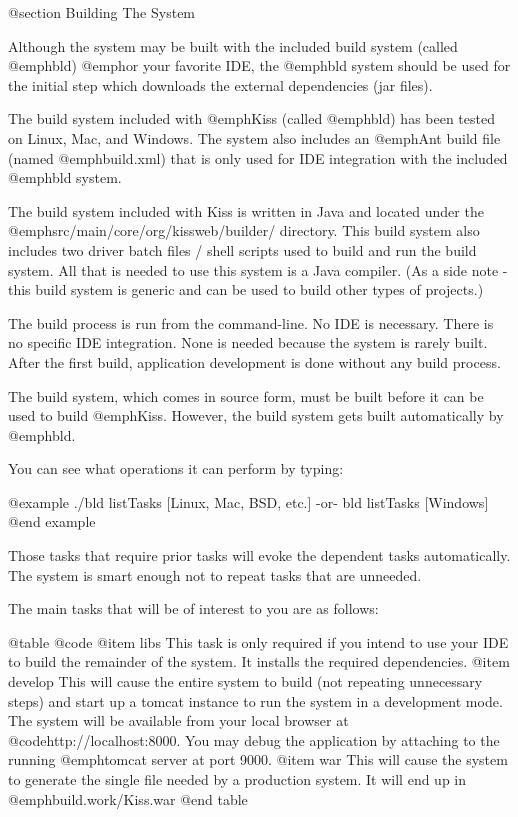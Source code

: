 @section Building The System

Although the system may be built with the included build system
(called @emph{bld}) @emph{or} your favorite IDE, the @emph{bld}
system should be used for the initial step which downloads the external
dependencies (jar files).

The build system included with @emph{Kiss} (called @emph{bld}) has
been tested on Linux, Mac, and Windows.  The system also includes an
@emph{Ant} build file (named @emph{build.xml}) that is only used for
IDE integration with the included @emph{bld} system.

The build system included with Kiss is written in Java and located
under the @emph{src/main/core/org/kissweb/builder/} directory.  This
build system also includes two driver batch files / shell scripts used
to build and run the build system.  All that is needed to use this
system is a Java compiler.  (As a side note - this build system is
generic and can be used to build other types of projects.)

The build process is run from the command-line.  No IDE is necessary.
There is no specific IDE integration.  None is needed because the system
is rarely built.  After the first build, application development is done
without any build process.

The build system, which comes in source form, must be built before it
can be used to build @emph{Kiss}.  However, the build system gets built
automatically by @emph{bld}.

You can see what operations it can perform by typing:

@example
    ./bld listTasks           [Linux, Mac, BSD, etc.]
        -or-
    bld listTasks             [Windows]
@end example

Those tasks that require prior tasks will evoke the dependent tasks
automatically.  The system is smart enough not to repeat tasks that
are unneeded.

The main tasks that will be of interest to you are as follows:

@table @code
@item libs
This task is only required if you intend to use your IDE to build the
remainder of the system.  It installs the required dependencies.
@item develop
This will cause the entire system to build (not repeating unnecessary
steps) and start up a tomcat instance to run the system in a
development mode.  The system will be available from your local
browser at @code{http://localhost:8000}.  You may debug the
application by attaching to the running @emph{tomcat} server at port
9000.
@item war
This will cause the system to generate the single file needed by a
production system.  It will end up in @emph{build.work/Kiss.war}
@end table

